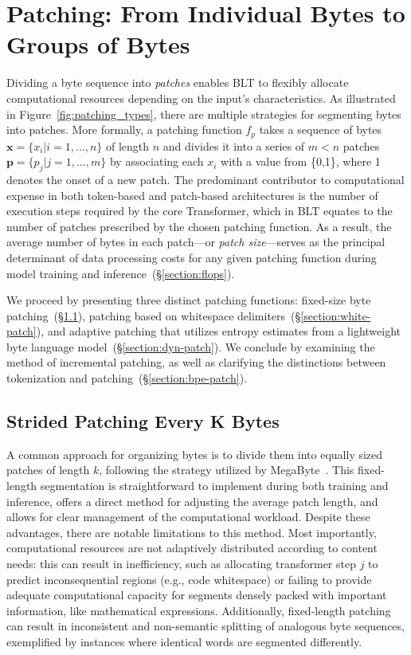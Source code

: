 \section{Patching: From Individual Bytes to Groups of Bytes}
\label{section:patching}

Dividing a byte sequence into \textit{patches} enables {\textsc BLT} to flexibly allocate computational resources depending on the input’s characteristics. As illustrated in Figure~\ref{fig:patching_types}, there are multiple strategies for segmenting bytes into patches. More formally, a patching function $f_p$ takes a sequence of bytes $\pmb{x} = \{x_i | i=1, \ldots, n\}$ of length $n$ and divides it into a series of $m < n$ patches $\pmb{p} = \{p_j | j=1, \ldots, m\}$ by associating each $x_i$ with a value from \{0,1\}, where 1 denotes the onset of a new patch. The predominant contributor to computational expense in both token-based and patch-based architectures is the number of execution steps required by the core Transformer, which in {\textsc BLT} equates to the number of patches prescribed by the chosen patching function. As a result, the average number of bytes in each patch—or \textit{patch size}—serves as the principal determinant of data processing costs for any given patching function during model training and inference~(\S\ref{section:flops}).

We proceed by presenting three distinct patching functions: fixed-size byte patching~(\S\ref{section:static-patch}), patching based on whitespace delimiters~(\S\ref{section:white-patch}), and adaptive patching that utilizes entropy estimates from a lightweight byte language model~(\S\ref{section:dyn-patch}). We conclude by examining the method of incremental patching, as well as clarifying the distinctions between tokenization and patching~(\S\ref{section:bpe-patch}).

\subsection{Strided Patching Every K Bytes}
\label{section:static-patch}

A common approach for organizing bytes is to divide them into equally sized patches of length $k$, following the strategy utilized by MegaByte~\citep{yu2023megabyte}. This fixed-length segmentation is straightforward to implement during both training and inference, offers a direct method for adjusting the average patch length, and allows for clear management of the computational workload. Despite these advantages, there are notable limitations to this method. Most importantly, computational resources are not adaptively distributed according to content needs: this can result in inefficiency, such as allocating transformer step $j$ to predict inconsequential regions (e.g., code whitespace) or failing to provide adequate computational capacity for segments densely packed with important information, like mathematical expressions. Additionally, fixed-length patching can result in inconsistent and non-semantic splitting of analogous byte sequences, exemplified by instances where identical words are segmented differently.

